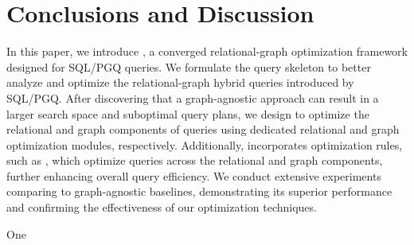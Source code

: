 \vspace{-5mm}
\section{Conclusions and Discussion}
\label{sec:conclusions}

In this paper, we introduce \name, a converged relational-graph optimization framework designed for SQL/PGQ queries. We formulate the \spjm query skeleton to better analyze and optimize the relational-graph hybrid queries introduced by SQL/PGQ. After discovering that a graph-agnostic approach can result in a larger search space and suboptimal query plans, we design \name to optimize the relational and graph components of \spjm queries using dedicated relational and graph optimization modules, respectively. Additionally, \name incorporates optimization rules, such as \filterrule, which optimize queries across the relational and graph components, further enhancing overall query efficiency.
We conduct extensive experiments comparing \name to graph-agnostic baselines, demonstrating its superior performance and confirming the effectiveness of our optimization techniques.



One 





\balance

